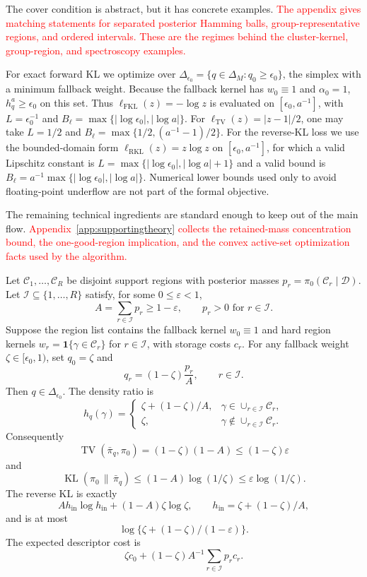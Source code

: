 \documentclass[twoside,11pt]{article}
\newcommand{\D}{\mathcal{D}}
\newcommand{\ind}{\mathbf{1}}
\newcommand{\TV}{\operatorname{TV}}
\newcommand{\KL}{\operatorname{KL}}
\newcommand{\rev}[1]{\textcolor{red}{#1}}
\begin{document}
The cover condition is abstract, but it has concrete examples. \rev{The appendix gives matching statements for separated posterior Hamming balls, group-representative regions, and ordered intervals. These are the regimes behind the cluster-kernel, group-region, and spectroscopy examples.}

For exact forward KL we optimize over \(\Delta_{\epsilon_0}=\{q\in\Delta_M:q_0\ge\epsilon_0\}\), the simplex with a minimum fallback weight. Because the fallback kernel has \(w_0\equiv1\) and \(\alpha_0=1\), \(h_q^a\ge\epsilon_0\) on this set. Thus \(\ell_{\mathrm{FKL}}(z)=-\log z\) is evaluated on \([\epsilon_0,a^{-1}]\), with \(L=\epsilon_0^{-1}\) and \(B_\ell=\max\{|\log\epsilon_0|,|\log a|\}\). For \(\ell_{\TV}(z)=|z-1|/2\), one may take \(L=1/2\) and \(B_\ell=\max\{1/2,(a^{-1}-1)/2\}\). For the reverse-KL loss we use the bounded-domain form \(\ell_{\mathrm{RKL}}(z)=z\log z\) on \([\epsilon_0,a^{-1}]\), for which a valid Lipschitz constant is \(L=\max\{|\log\epsilon_0|,|\log a|+1\}\) and a valid bound is \(B_\ell=a^{-1}\max\{|\log\epsilon_0|,|\log a|\}\). Numerical lower bounds used only to avoid floating-point underflow are not part of the formal objective.

The remaining technical ingredients are standard enough to keep out of the main flow. \rev{Appendix~\ref{app:supportingtheory} collects the retained-mass concentration bound, the one-good-region implication, and the convex active-set optimization facts used by the algorithm.}

\begin{theorem}
\label{thm:regioncompressibility}
Let \(\mathcal C_1,\dots,\mathcal C_R\) be disjoint support regions with posterior masses \(p_r=\pi_0(\mathcal C_r\mid\D)\). Let \(\mathcal I\subseteq\{1,\dots,R\}\) satisfy, for some \(0\le\varepsilon<1\),
\[
A=\sum_{r\in\mathcal I}p_r\ge1-\varepsilon , \qquad p_r>0 \text{ for } r\in\mathcal I .
\]
Suppose the region list contains the fallback kernel \(w_0\equiv1\) and hard region kernels \(w_r=\ind\{\gamma\in\mathcal C_r\}\) for \(r\in\mathcal I\), with storage costs \(c_r\). For any fallback weight \(\zeta\in[\epsilon_0,1)\), set \(q_0=\zeta\) and
\[
q_r=(1-\zeta)\frac{p_r}{A}, \qquad r\in\mathcal I .
\]
Then \(q\in\Delta_{\epsilon_0}\). The density ratio is
\[
h_q(\gamma)=\begin{cases}
\zeta+(1-\zeta)/A, & \gamma\in\cup_{r\in\mathcal I}\mathcal C_r,\\
\zeta, & \gamma\notin\cup_{r\in\mathcal I}\mathcal C_r .
\end{cases}
\]
Consequently
\[
\TV(\bar\pi_q,\pi_0)=(1-\zeta)(1-A)\le(1-\zeta)\varepsilon
\]
and
\[
\KL(\pi_0\,\|\,\bar\pi_q) \le (1-A)\log(1/\zeta) \le \varepsilon\log(1/\zeta).
\]
The reverse KL is exactly
\[
A h_{\mathrm{in}}\log h_{\mathrm{in}}+(1-A)\zeta\log\zeta , \qquad h_{\mathrm{in}}=\zeta+(1-\zeta)/A,
\]
and is at most
\[
\log\{\zeta+(1-\zeta)/(1-\varepsilon)\}.
\]
The expected descriptor cost is
\[
\zeta c_0+(1-\zeta)A^{-1}\sum_{r\in\mathcal I}p_r c_r .
\]
\end{theorem}
\end{document}
